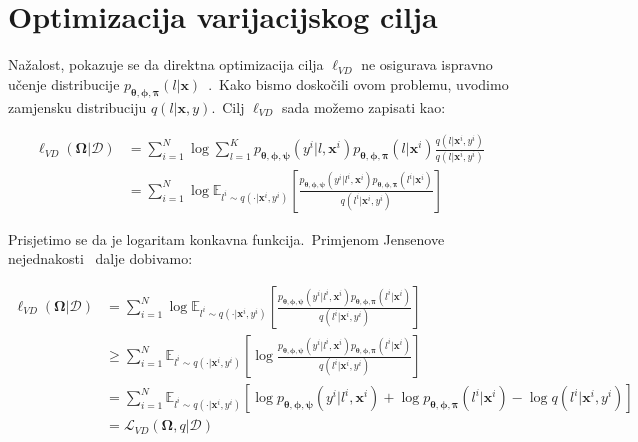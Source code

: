 \documentclass[diplomskirad]{fer}
\begin{document}
\section{Optimizacija varijacijskog cilja}
\label{sek:var_cilj}

Nažalost, pokazuje se da direktna optimizacija cilja $\ell_{VD}$ ne osigurava ispravno učenje distribucije $p_{\bm{\theta}, \bm{\phi}, \bm{\pi}}(l | \bm{x})$~\cite{mclachlan2008algorithm}.\ 
Kako bismo doskočili ovom problemu, uvodimo zamjensku distribuciju $q(l | \bm{x}, y)$.\ Cilj $\ell_{VD}$ sada možemo zapisati kao:

\begin{equation}
  \begin{aligned}
    \ell_{VD}(\bm{\Omega}|\mathcal{D}) &= \sum_{i=1}^{N} \log \sum_{l=1}^{K} p_{\bm{\theta}, \bm{\phi}, \bm{\psi}}(y^i | l, \bm{x}^i) p_{\bm{\theta}, \bm{\phi}, \bm{\pi}}(l | \bm{x}^i) \frac{q(l | \bm{x}^i, y^i)}{q(l | \bm{x}^i, y^i)} \\
                                 &= \sum_{i=1}^{N} \log \mathbb{E}_{l^i \sim q(\cdot | \bm{x}^i, y^i)} \left[ \frac{p_{\bm{\theta}, \bm{\phi}, \bm{\psi}}(y^i | l^i, \bm{x}^i) p_{\bm{\theta}, \bm{\phi}, \bm{\pi}}(l^i | \bm{x}^i)}{q(l^i | \bm{x}^i, y^i)} \right]
  \end{aligned}
  \label{eq:vibe_added_q}
\end{equation}

Prisjetimo se da je logaritam konkavna funkcija.\ Primjenom Jensenove nejednakosti~\cite{mcshane1937jensen} dalje dobivamo:

\begin{equation}
  \begin{aligned}
    \ell_{VD}(\bm{\Omega}|\mathcal{D}) &= \sum_{i=1}^{N} \log \mathbb{E}_{l^i \sim q(\cdot | \bm{x}^i, y^i)} \left[ \frac{p_{\bm{\theta}, \bm{\phi}, \bm{\psi}}(y^i | l^i, \bm{x}^i) p_{\bm{\theta}, \bm{\phi}, \bm{\pi}}(l^i | \bm{x}^i)}{q(l^i | \bm{x}^i, y^i)} \right] \\
                                 &\geq \sum_{i=1}^{N} \mathbb{E}_{l^i \sim q(\cdot | \bm{x}^i, y^i)} \left[\log \frac{p_{\bm{\theta}, \bm{\phi}, \bm{\psi}}(y^i | l^i, \bm{x}^i) p_{\bm{\theta}, \bm{\phi}, \bm{\pi}}(l^i | \bm{x}^i)}{q(l^i | \bm{x}^i, y^i)} \right] \\
                                 &= \sum_{i=1}^{N} \mathbb{E}_{l^i \sim q(\cdot | \bm{x}^i, y^i)} \left[\log p_{\bm{\theta}, \bm{\phi}, \bm{\psi}}(y^i | l^i, \bm{x}^i) + \log p_{\bm{\theta}, \bm{\phi}, \bm{\pi}}(l^i | \bm{x}^i) - \log q(l^i | \bm{x}^i, y^i) \right] \\
                                 &= \mathcal{L}_{VD}(\bm{\Omega}, q | \mathcal{D})
  \end{aligned}
  \label{eq:vibe_jensen}
\end{equation}
\end{document}
